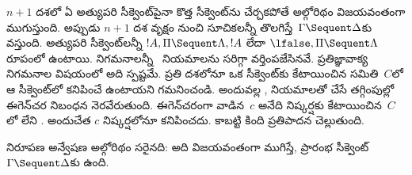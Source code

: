 \documentclass[../../../include/open-logic-section]{subfiles}
\begin{document}
$n+1$ దశలో ఏ అత్యుపరి సీక్వెంట్‌పైనా కొత్త సీక్వెంట్‌ను చేర్చకపోతే అల్గోరిథం విజయవంతంగా ముగుస్తుంది. అప్పుడు $n+1$ దశ వృక్షం నుంచి సూచికలన్నీ తొలగిస్తే~$\Gamma \Sequent \Delta$కు  వస్తుంది. అత్యుపరి సీక్వెంట్‌లన్నీ $!A, \Pi \Sequent \Lambda, !A$ లేదా $\lfalse, \Pi
\Sequent \Lambda$ రూపంలో ఉంటాయి. నిగమనాలన్నీ~ నియమాలను సరిగ్గా వర్తింపజేసినవే. ప్రతిజ్ఞావాక్య నిగమనాల విషయంలో అది స్పష్టమే. ప్రతి దశలోనూ ఒక సీక్వెంట్‌కు కేటాయించిన  సమితి~$C$లో ఆ సీక్వెంట్‌లో కనిపించే  ఉంటాయని గమనించండి. అందువల్ల \LeftR{\lexists}, \RightR{\lforall} నియమాలతో చేసే తగ్గింపుల్లో ఈగెన్‌చర నిబంధన నెరవేరుతుంది. ఈగెన్‌చరంగా వాడిన~$c$ అనేది నిష్కర్షకు కేటాయించిన~$C$లో లేని . అందుచేత $c$ నిష్కర్షలోనూ కనిపించదు. కాబట్టి కింది ప్రతిపాదన చెల్లుతుంది.

\begin{prop}
 నిరూపణ అన్వేషణ అల్గోరిథం సరైనది: అది విజయవంతంగా ముగిస్తే, ప్రారంభ సీక్వెంట్~$\Gamma \Sequent \Delta$కు  ఉంది.
\end{prop}
\end{document}
